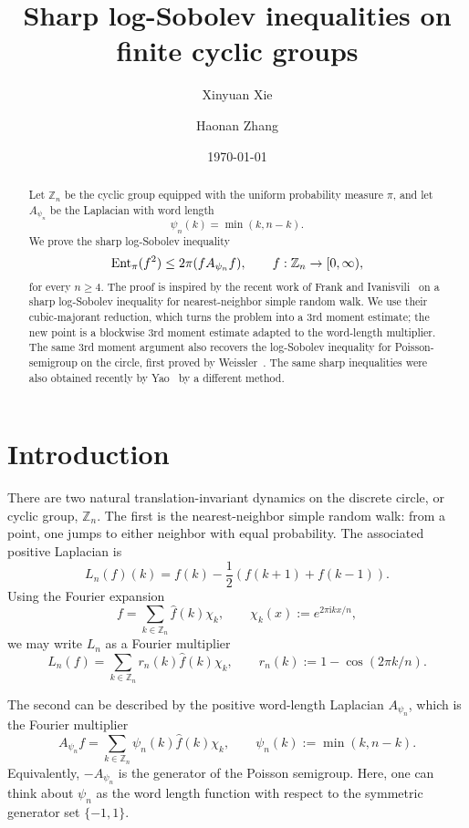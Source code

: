 \documentclass[11pt]{amsart}
\title{Sharp log-Sobolev inequalities on finite cyclic groups}
\author[X. Xie]{Xinyuan Xie}
\author[H. Zhang]{Haonan Zhang}
\date{\today}
\numberwithin{equation}{section}
\theoremstyle{plain}
\theoremstyle{remark}
\newcommand{\Zn}[1]{\mathbb Z_{#1}}
\newcommand{\ch}[1]{\chi_{#1}}
\newcommand{\wh}[1]{\widehat{#1}}
\newcommand{\psin}{\psi_n}
\newcommand{\Apsi}{A_{\psin}}
\newcommand{\Lcyc}{L_n}
\newcommand{\ii}{\mathrm i}
\begin{document}
\begin{abstract}
Let \(\mathbb Z_n\) be the cyclic group equipped with the uniform probability
measure \(\pi\), and let \(A_{\psi_n}\) be the Laplacian
with word length
\[
  \psi_n(k) = \min(k,n-k).
\]
We prove the sharp log-Sobolev inequality
\[
  \textnormal{Ent}_{\pi}(f^2)
  \le 2\pi(f A_{\psi_n} f),
  \qquad f:\mathbb Z_n \to [0,\infty),
\]
for every \(n \ge 4\). The proof is inspired by the recent work of Frank and
Ivanisvili~\cite{FrankIvanisvili2026} on a sharp log-Sobolev inequality for
nearest-neighbor simple random walk. We use their cubic-majorant
reduction, which turns the problem into a 3rd moment estimate; the new point is a blockwise 3rd moment estimate adapted to the word-length multiplier. The same 3rd moment argument also recovers the log-Sobolev inequality for Poisson-semigroup on the circle, first proved by Weissler~\cite{Weissler1980}.  The same sharp inequalities were also
obtained recently by Yao~\cite{Yao2026} by a different method.
\end{abstract}

\maketitle


\section{Introduction}

There are two natural translation-invariant dynamics on the discrete circle, or cyclic group,
\(\Zn{n}\).  The first is the nearest-neighbor simple random walk: from a
point, one jumps to either neighbor with equal probability.  The associated
positive Laplacian is
\[
  \Lcyc (f)(k)=f(k)-\frac{1}{2}(f(k+1)+f(k-1)).
\]
Using the Fourier expansion
\[
f=\sum_{k\in \Zn{n}} \wh f(k)\ch{k}, \qquad  \ch{k}(x):=e^{2\pi \ii kx/n},
\]
we may write $L_n$ as a Fourier multiplier
\[
L_n(f)=\sum_{k\in \Zn{n}}r_n(k)\wh f(k)\ch{k},\qquad r_n(k):=1-\cos(2\pi k/n).
\]

The second can be described by the positive word-length Laplacian $\Apsi$, which is the Fourier
multiplier
\[
  \Apsi f=\sum_{k\in \Zn{n}}\psin(k)\wh f(k)\ch{k},
  \qquad
  \psin(k):=\min(k,n-k).
\]
Equivalently, $-\Apsi$ is the generator of the Poisson semigroup.
Here, one can think about $\psin$ as the word length function with respect to the symmetric generator set $\{-1,1\}$.
\end{document}
